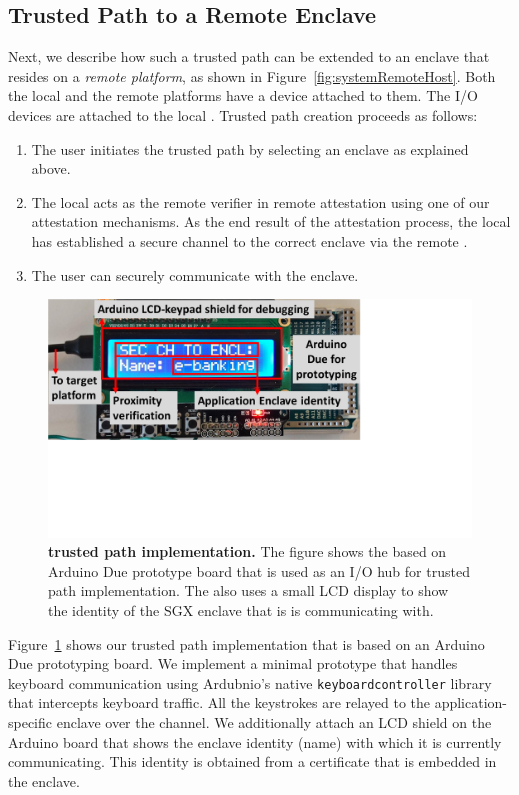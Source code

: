 \subsection{Trusted Path to a Remote Enclave} 

Next, we describe how such a trusted path can be extended to an enclave that resides on a \emph{remote platform}, as shown in Figure~\ref{fig:systemRemoteHost}. Both the local and the remote platforms have a \device device attached to them. The I/O devices are attached to the local \device. Trusted path creation proceeds as follows:

\begin{enumerate}
	\item[\one] The user initiates the trusted path by selecting an enclave as explained above.
	\item[\two] The local \device acts as the remote verifier in remote attestation using one of our attestation mechanisms. As the end result of the attestation process, the local \device has established a secure channel to the correct enclave via the remote \device.
	\item[\three] The user can securely communicate with the enclave.
\end{enumerate}

 
\begin{figure}[t]
  \centering
    \includegraphics[trim={0 7.5cm 9cm 0}, clip, width=0.7\linewidth]{chapters/ProximiTEE/images/Setup1.pdf}
    \caption[\name trusted path implementation]{\textbf{\name trusted path implementation.} The figure shows the \device based on Arduino Due prototype board that is used as an I/O hub for trusted path implementation. The \device also uses a small LCD display to show the identity of the SGX enclave that is is communicating with.}
    \label{fig:trustedPathImplementation}
\end{figure}


Figure~\ref{fig:trustedPathImplementation} shows our trusted path implementation that is based on an Arduino Due prototyping board. We implement a minimal prototype that handles keyboard communication using Ardubnio's native \texttt{keyboardcontroller} library that intercepts keyboard traffic. All the keystrokes are relayed to the application-specific enclave over the \tls channel. 
%
We additionally attach an LCD shield on the Arduino board that shows the enclave identity (name) with which it is currently communicating. This identity is obtained from a certificate that is embedded in the enclave.



